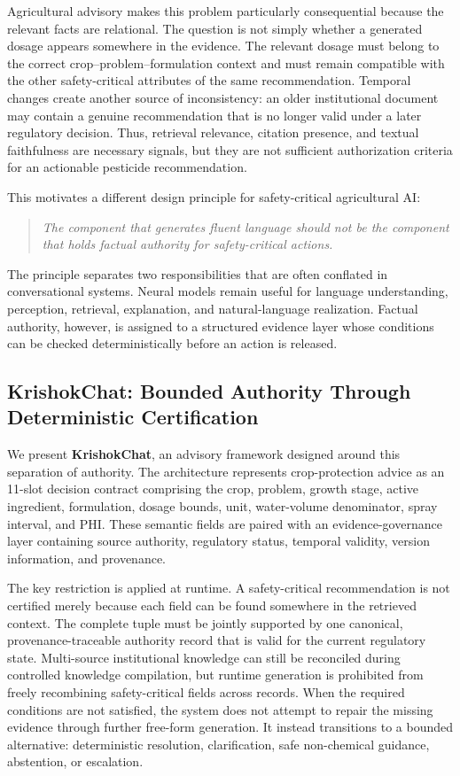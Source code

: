 \documentclass[a4paper,fleqn]{cas-dc}
\begin{document}
Agricultural advisory makes this problem particularly consequential because the relevant facts are relational. The question is not simply whether a generated dosage appears somewhere in the evidence. The relevant dosage must belong to the correct crop--problem--formulation context and must remain compatible with the other safety-critical attributes of the same recommendation. Temporal changes create another source of inconsistency: an older institutional document may contain a genuine recommendation that is no longer valid under a later regulatory decision. Thus, retrieval relevance, citation presence, and textual faithfulness are necessary signals, but they are not sufficient authorization criteria for an actionable pesticide recommendation.

This motivates a different design principle for safety-critical agricultural AI:
\begin{quote}
\emph{The component that generates fluent language should not be the component that holds factual authority for safety-critical actions.}
\end{quote}
The principle separates two responsibilities that are often conflated in conversational systems. Neural models remain useful for language understanding, perception, retrieval, explanation, and natural-language realization. Factual authority, however, is assigned to a structured evidence layer whose conditions can be checked deterministically before an action is released.

\subsection{KrishokChat: Bounded Authority Through Deterministic Certification}
We present \textbf{KrishokChat}, an advisory framework designed around this separation of authority. The architecture represents crop-protection advice as an 11-slot decision contract comprising the crop, problem, growth stage, active ingredient, formulation, dosage bounds, unit, water-volume denominator, spray interval, and PHI. These semantic fields are paired with an evidence-governance layer containing source authority, regulatory status, temporal validity, version information, and provenance.

The key restriction is applied at runtime. A safety-critical recommendation is not certified merely because each field can be found somewhere in the retrieved context. The complete tuple must be jointly supported by one canonical, provenance-traceable authority record that is valid for the current regulatory state. Multi-source institutional knowledge can still be reconciled during controlled knowledge compilation, but runtime generation is prohibited from freely recombining safety-critical fields across records. When the required conditions are not satisfied, the system does not attempt to repair the missing evidence through further free-form generation. It instead transitions to a bounded alternative: deterministic resolution, clarification, safe non-chemical guidance, abstention, or escalation.
\end{document}
